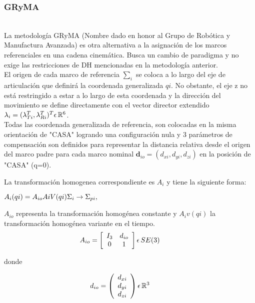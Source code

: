 \documentclass[journal, trans, spanish]{IEEEtran}
\begin{document}
\subsubsection{GRyMA}
\\ 
\noindent La metodología GRyMA (Nombre dado en honor al Grupo de Robótica y Manufactura Avanzada) es otra alternativa a la asignación de los marcos referenciales en una cadena cinemática. Busca un cambio de paradigma y no exige las restricciones de DH mencionadas en la metodología anterior. 
\\ 
\noindent El origen de cada marco de referencia $ \sum_i$ se coloca a lo largo del eje de articulación que definirá la coordenada generalizada $ qi$. No obstante, el eje z no está restringido a estar a lo largo de esta coordenada y la dirección del movimiento se define directamente con el vector director extendido $ \lambda_i=(\lambda_{Ti}^T, \lambda_{Ri}^T)^T \epsilon \thinspace \mathbb{R}^6 $. 
\\ 
\noindent Todas las coordenada generalizada de referencia, son colocadas en la misma orientación de "CASA" logrando una configuración nula y 3 parámetros de compensación son definidos para representar la distancia relativa desde el origen del marco padre para cada marco nominal $ \mathbf{d}_{io}=(d_{xi}, d_{yi}, d_{zi})$ en la posición de "CASA" (q=0).

La transformación homogenea correspondiente es $A_i$ y tiene la siguiente forma:

$A_i(qi)=A_{io}A{iV}(qi) \hfill \Sigma_i \rightarrow \Sigma_{pi},$

$A_{io}$ representa la transformación homogénea constante y $A_iv(qi)$ la transformación homogénea variante en el tiempo.
\begin{equation*}
    \hspace{-10mm}
    A_{io} = \left[
        \begin{array}{cc}
            I_{3} & d_{io}\\
            0 & 1\\
        \end{array}\right]  \epsilon \thinspace SE(3) 
\end{equation*} 

donde 

\begin{equation*}
    \hspace{-10mm}
    d_{io} = \left(
        \begin{array}{c}
            d_{xi}\\
            d_{yi}\\
            d_{zi}\\
        \end{array}\right) \epsilon \thinspace \mathbb{R}^3 
\end{equation*} 
\end{document}
